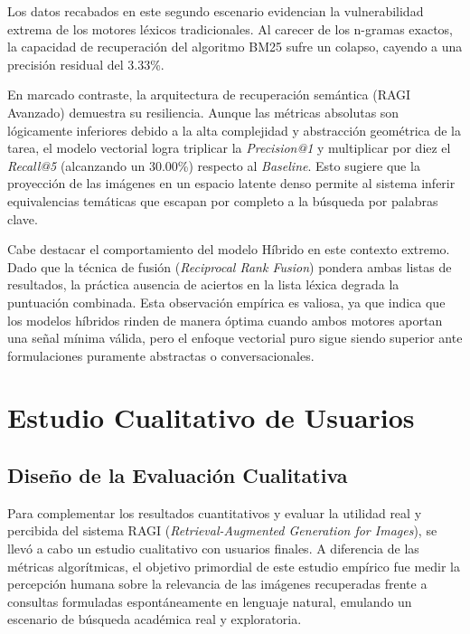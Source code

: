 \documentclass[a4paper]{report}
\begin{document}
Los datos recabados en este segundo escenario evidencian la vulnerabilidad extrema de los motores léxicos tradicionales. Al carecer de los n-gramas exactos, la capacidad de recuperación del algoritmo BM25 sufre un colapso, cayendo a una precisión residual del 3.33\%. 

En marcado contraste, la arquitectura de recuperación semántica (RAGI Avanzado) demuestra su resiliencia. Aunque las métricas absolutas son lógicamente inferiores debido a la alta complejidad y abstracción geométrica de la tarea, el modelo vectorial logra triplicar la \textit{Precision@1} y multiplicar por diez el \textit{Recall@5} (alcanzando un 30.00\%) respecto al \textit{Baseline}. Esto sugiere que la proyección de las imágenes en un espacio latente denso permite al sistema inferir equivalencias temáticas que escapan por completo a la búsqueda por palabras clave.

Cabe destacar el comportamiento del modelo Híbrido en este contexto extremo. Dado que la técnica de fusión (\textit{Reciprocal Rank Fusion}) pondera ambas listas de resultados, la práctica ausencia de aciertos en la lista léxica degrada la puntuación combinada. Esta observación empírica es valiosa, ya que indica que los modelos híbridos rinden de manera óptima cuando ambos motores aportan una señal mínima válida, pero el enfoque vectorial puro sigue siendo superior ante formulaciones puramente abstractas o conversacionales.

\section{Estudio Cualitativo de Usuarios}
\label{sec:estudio_cualitativo}

\subsection{Diseño de la Evaluación Cualitativa}
\label{sec:eval_cualitativa_diseno}

Para complementar los resultados cuantitativos y evaluar la utilidad real y percibida del sistema RAGI (\textit{Retrieval-Augmented Generation for Images}), se llevó a cabo un estudio cualitativo con usuarios finales. A diferencia de las métricas algorítmicas, el objetivo primordial de este estudio empírico fue medir la percepción humana sobre la relevancia de las imágenes recuperadas frente a consultas formuladas espontáneamente en lenguaje natural, emulando un escenario de búsqueda académica real y exploratoria.
\end{document}
